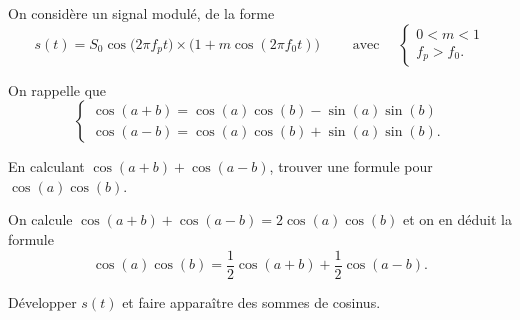 On considère un signal modulé, de la forme
\[
s(t)= S_0 \cos \big( 2\pi f_p t\big) \times \Big(1+m \cos \left(2\pi f_0 t\right) \Big) \qquad \text{ avec } \quad 
\begin{cases}
0<m<1 \\
f_p>f_0.
\end{cases}
\]

\debutEntrainement


\begin{enonce}
On rappelle que \minusSmallskip
\[
\begin{cases}
\cos \left(a + b\right) = \cos(a) \cos(b) - \sin(a) \sin(b) \\
\cos \left(a - b\right) = \cos(a) \cos(b) + \sin(a) \sin(b).
\end{cases}
\]
\smallskip

En calculant $\cos \left(a + b\right) + \cos \left(a - b\right)$, trouver 
	une formule pour $\cos(a) \cos(b)$.\smallskip\\\mbox{}
\end{enonce}


\begin{corrige}
On calcule $\cos \left(a + b\right) + \cos \left(a - b\right) =	2 \cos(a) \cos(b)$ et on en déduit la formule
\[
\cos(a) \cos(b) = \frac{1}{2}\cos \left(a + b\right) + \frac{1}{2}\cos \left(a - b\right).
\]
\end{corrige}


	
	\begin{enonce}
	Développer $s(t)$ et faire apparaître des sommes de cosinus. \smallskip\\\mbox{}
	\end{enonce}
	
	
